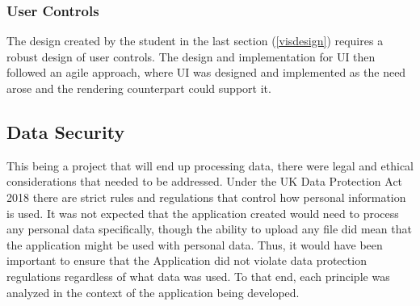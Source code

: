 \subsubsection{User Controls}
The design created by the student in the last section (\ref{visdesign}) requires a robust design of user controls. The design and implementation for UI then followed an agile approach, where UI was designed and implemented as the need arose and the rendering counterpart could support it.

\subsection{Data Security} \label{datasecurity}
This being a project that will end up processing data, there were legal and ethical considerations that needed to be addressed. Under the UK Data Protection Act 2018 \cite{govuk_2018_data} there are strict rules and regulations that control how personal information is used. It was not expected that the application created would need to process any personal data specifically, though the ability to upload any file did mean that the application might be used with personal data. Thus, it would have been important to ensure that the Application did not violate data protection regulations regardless of what data was used. To that end, each principle was analyzed in the context of the application being developed.

